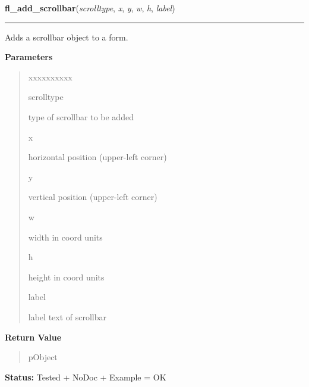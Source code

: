     \label{xformslib:library:fl_add_scrollbar}

    \vspace{0.5ex}

\hspace{.8\funcindent}\begin{boxedminipage}{\funcwidth}

    \raggedright \textbf{fl\_add\_scrollbar}(\textit{scrolltype}, \textit{x}, \textit{y}, \textit{w}, \textit{h}, \textit{label})

    \vspace{-1.5ex}

    \rule{\textwidth}{0.5\fboxrule}
\setlength{\parskip}{2ex}
    Adds a scrollbar object to a form.

\setlength{\parskip}{1ex}
      \textbf{Parameters}
      \vspace{-1ex}

      \begin{quote}
        \begin{Ventry}{xxxxxxxxxx}

          \item[scrolltype]

          type of scrollbar to be added

          \item[x]

          horizontal position (upper-left corner)

          \item[y]

          vertical position (upper-left corner)

          \item[w]

          width in coord units

          \item[h]

          height in coord units

          \item[label]

          label text of scrollbar

        \end{Ventry}

      \end{quote}

      \textbf{Return Value}
    \vspace{-1ex}

      \begin{quote}
      pObject

      \end{quote}

\textbf{Status:} Tested + NoDoc + Example = OK



    \end{boxedminipage}

